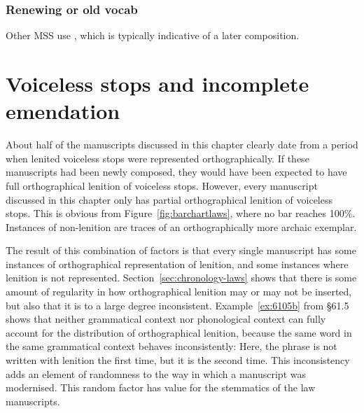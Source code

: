 \subsubsection{Renewing or old vocab}
\label{sec:renewing-or-old}


Other MSS use , which is typically indicative of a later composition.

\section{Voiceless stops and incomplete emendation}
\label{sec:voiceless-stops}
About half of the manuscripts discussed in this chapter clearly date from a period when lenited voiceless stops were represented orthographically. If these manuscripts had been newly composed, they would have been expected to  have full orthographical lenition of voiceless stops. However, every manuscript discussed in this chapter only has partial orthographical lenition of voiceless stops. This is obvious from Figure~\ref{fig:barchartlaws}, where no bar reaches 100\%. Instances of non-lenition are traces of an orthographically more archaic exemplar.

The result of this combination of factors is that every single  manuscript has some instances of orthographical representation of lenition, and some instances where lenition is not represented. Section~\ref{sec:chronology-laws} shows that there is some amount of regularity in how orthographical lenition may or may not be inserted, but also that it is to a large degree inconsistent. Example~\ref{ex:6105b} from \S 61.5 shows that neither grammatical context nor phonological context can fully account for the distribution of orthographical lenition, because the same word in the same grammatical context behaves inconsistently:
Here, the phrase  is not written with lenition the first time, but it is the second time. This inconsistency adds an element of randomness to the way in which a manuscript was modernised. This random factor has value for the stemmatics of the law manuscripts. 

